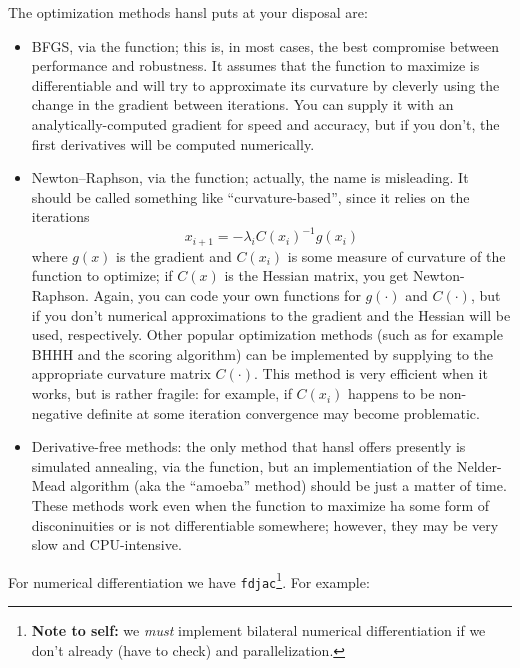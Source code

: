 The optimization methods hansl puts at your disposal are:
\begin{itemize}
\item BFGS, via the  function; this is, in most cases,
  the best compromise between performance and robustness. It assumes
  that the function to maximize is differentiable and will try to
  approximate its curvature by cleverly using the change in the
  gradient between iterations. You can supply it with an
  analytically-computed gradient for speed and accuracy, but if you
  don't, the first derivatives will be computed numerically. 
\item Newton--Raphson, via the  function; actually, the
  name is misleading. It should be called something like
  ``curvature-based'', since it relies on the iterations
  \[
    x_{i+1} = -\lambda_i C(x_i)^{-1} g(x_i)
  \]
  where $g(x)$ is the gradient and $C(x_i)$ is some measure of
  curvature of the function to optimize; if $C(x)$ is the Hessian
  matrix, you get Newton-Raphson. Again, you can code your own
  functions for $g(\cdot)$ and $C(\cdot)$, but if you don't numerical
  approximations to the gradient and the Hessian will be used,
  respectively. Other popular optimization methods (such as for
  example BHHH and the scoring algorithm) can be implemented by
  supplying to the appropriate curvature matrix
  $C(\cdot)$. This method is very efficient when it works, but is
  rather fragile: for example, if $C(x_i)$ happens to be non-negative
  definite at some iteration convergence may become problematic.
\item Derivative-free methods: the only method that hansl offers
  presently is simulated annealing, via the  function,
  but an implementiation of the Nelder-Mead algorithm (aka the
  ``amoeba'' method) should be just a matter of time. These methods
  work even when the function to maximize ha some form of
  disconinuities or is not differentiable somewhere; however, they may
  be very slow and CPU-intensive.
\end{itemize}


For numerical differentiation we have
\texttt{fdjac}\footnote{\textbf{Note to self:} we \emph{must}
  implement bilateral numerical differentiation if we don't already
  (have to check) and parallelization.}. For example:

